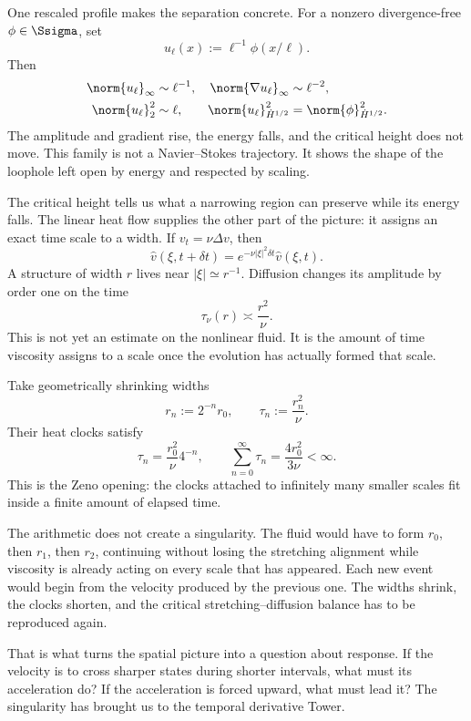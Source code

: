 One rescaled profile makes the separation concrete.  For a nonzero
divergence-free \(\phi\in\Ssigma\), set
\[
  u_\ell(x):=\ell^{-1}\phi(x/\ell).
\]
Then
\[
\begin{aligned}
  \norm{u_\ell}_\infty&\sim\ell^{-1},
  &\norm{\nabla u_\ell}_\infty&\sim\ell^{-2},
  \\
  \norm{u_\ell}_2^2&\sim\ell,
  &\norm{u_\ell}_{\dot H^{1/2}}^2
  &=\norm{\phi}_{\dot H^{1/2}}^2.
\end{aligned}
\]
The amplitude and gradient rise, the energy falls, and the critical height
does not move.  This family is not a Navier--Stokes trajectory.  It shows the
shape of the loophole left open by energy and respected by scaling.

The critical height tells us what a narrowing region can preserve while its
energy falls.  The linear heat flow supplies the other part of the picture: it
assigns an exact time scale to a width.  If
\(v_t=\nu\Delta v\), then
\[
  \widehat v(\xi,t+\delta t)
  =e^{-\nu|\xi|^2\delta t}\widehat v(\xi,t).
\]
A structure of width \(r\) lives near \(|\xi|\simeq r^{-1}\).  Diffusion
changes its amplitude by order one on the time
\begin{equation}\label{eq:BodyHeatComparisonTime}
  \tau_\nu(r)\asymp\frac{r^2}{\nu}.
\end{equation}
This is not yet an estimate on the nonlinear fluid.  It is the amount of time
viscosity assigns to a scale once the evolution has actually formed that
scale.

Take geometrically shrinking widths
\[
  r_n:=2^{-n}r_0,
  \qquad
  \tau_n:=\frac{r_n^2}{\nu}.
\]
Their heat clocks satisfy
\begin{equation}\label{eq:BodyZenoHeatClock}
  \tau_n=\frac{r_0^2}{\nu}4^{-n},
  \qquad
  \sum_{n=0}^{\infty}\tau_n
  =\frac{4r_0^2}{3\nu}<\infty.
\end{equation}
This is the Zeno opening: the clocks attached to infinitely many smaller
scales fit inside a finite amount of elapsed time.

The arithmetic does not create a singularity.  The fluid would have to form
\(r_0\), then \(r_1\), then \(r_2\), continuing without losing the
stretching alignment while viscosity is already acting on every scale that
has appeared.  Each new event would begin from the velocity produced by the
previous one.  The widths shrink, the clocks shorten, and the critical
stretching--diffusion balance has to be reproduced again.

That is what turns the spatial picture into a question about response.  If the
velocity is to cross sharper states during shorter intervals, what must its
acceleration do?  If the acceleration is forced upward, what must lead it?
The singularity has brought us to the temporal derivative Tower.

